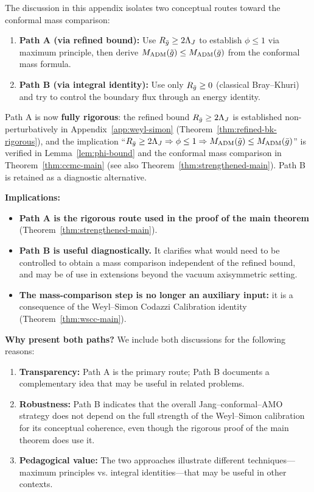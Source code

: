 \begin{remark}\label{rem:robustness}
The discussion in this appendix isolates two conceptual routes toward the conformal mass comparison:
\begin{enumerate}
    \item \textbf{Path A (via refined bound):} Use $R_{\bar{g}} \geq 2\Lambda_J$ to establish $\phi \leq 1$ via maximum principle, then derive $M_{\mathrm{ADM}}(\tilde{g}) \leq M_{\mathrm{ADM}}(\bar{g})$ from the conformal mass formula.
    \item \textbf{Path B (via integral identity):} Use only $R_{\bar{g}} \geq 0$ (classical Bray--Khuri) and try to control the boundary flux through an energy identity.
\end{enumerate}
Path A is now \textbf{fully rigorous}: the refined bound $R_{\bar{g}}\geq 2\Lambda_J$ is established non-perturbatively in Appendix~\ref{app:weyl-simon} (Theorem~\ref{thm:refined-bk-rigorous}), and the implication ``$R_{\bar{g}}\geq 2\Lambda_J\Rightarrow \phi\leq 1\Rightarrow M_{\mathrm{ADM}}(\tilde{g})\leq M_{\mathrm{ADM}}(\bar{g})$'' is verified in Lemma~\ref{lem:phi-bound} and the conformal mass comparison in Theorem~\ref{thm:ccmc-main} (see also Theorem~\ref{thm:strengthened-main}). Path B is retained as a diagnostic alternative.

\textbf{Implications:}
\begin{itemize}
\item \textbf{Path A is the rigorous route used in the proof of the main theorem} (Theorem~\ref{thm:strengthened-main}).
\item \textbf{Path B is useful diagnostically.} It clarifies what would need to be controlled to obtain a mass comparison independent of the refined bound, and may be of use in extensions beyond the vacuum axisymmetric setting.
\item \textbf{The mass-comparison step is no longer an auxiliary input:} it is a consequence of the Weyl--Simon Codazzi Calibration identity (Theorem~\ref{thm:wscc-main}).
\end{itemize}
\textbf{Why present both paths?} We include both discussions for the following reasons:
\begin{enumerate}[label=(\roman*)]
\item \textbf{Transparency:} Path A is the primary route; Path B documents a complementary idea that may be useful in related problems.
\item \textbf{Robustness:} Path B indicates that the overall Jang--conformal--AMO strategy does not depend on the full strength of the Weyl--Simon calibration for its conceptual coherence, even though the rigorous proof of the main theorem does use it.
\item \textbf{Pedagogical value:} The two approaches illustrate different techniques---maximum principles vs. integral identities---that may be useful in other contexts.
\end{enumerate}
\end{remark}

